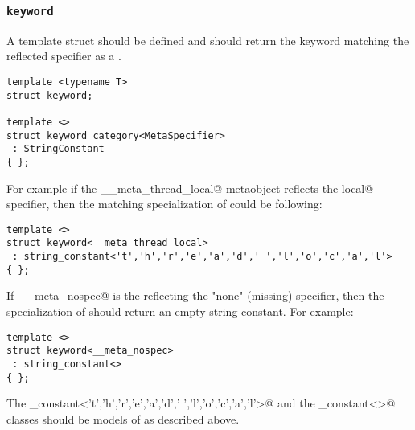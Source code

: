 \subsubsection{\texttt{keyword}}

A template struct \verb@keyword@ should be defined and should return
the keyword matching the reflected specifier as a
.

\begin{verbatim}
template <typename T>
struct keyword;

template <>
struct keyword_category<MetaSpecifier>
 : StringConstant
{ };
\end{verbatim}

For example if the \verb@__meta_thread_local@ metaobject reflects the \verb@thread local@
specifier, then the matching specialization of \verb@keyword@ could be following:

\begin{verbatim}
template <>
struct keyword<__meta_thread_local>
 : string_constant<'t','h','r','e','a','d',' ','l','o','c','a','l'>
{ };
\end{verbatim}

If \verb@__meta_nospec@ is the  reflecting the "none" (missing) specifier,
then the specialization of \verb@keyword@ should return an empty string constant.
For example:

\begin{verbatim}
template <>
struct keyword<__meta_nospec>
 : string_constant<>
{ };
\end{verbatim}

The \verb@string_constant<'t','h','r','e','a','d',' ','l','o','c','a','l'>@
and the \verb@string_constant<>@ classes should be models of 
as described above.

